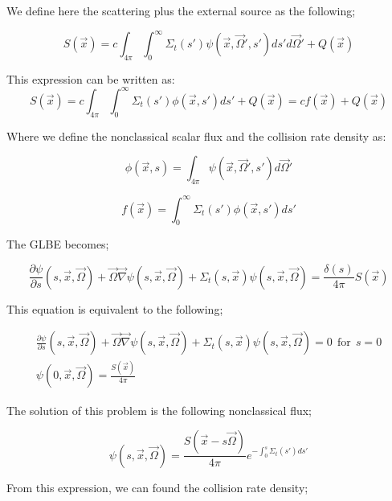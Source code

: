 \documentclass[a4paper, 12pt]{report}
\begin{document}
\begin{appendix}
We define here the scattering plus the external source as the following;

\begin{equation}
S(\vec{x}) = c \int_{4\pi}\int_0^\infty \Sigma_t(s') \psi(\vec{x},\vec{\Omega}',s') ds'd\vec{\Omega}' + Q(\vec{x})
\end{equation}

This expression can be written as:
\begin{equation}
S(\vec{x}) = c \int_{4\pi}\int_0^\infty \Sigma_t(s') \phi(\vec{x},s') ds' + Q(\vec{x}) = cf(\vec{x}) + Q(\vec{x})
\end{equation}

Where we define the nonclassical scalar flux and the collision rate density as:

\begin{equation}
\phi(\vec{x},s) = \int_{4\pi} \psi(\vec{x},\vec{\Omega}',s') d\vec{\Omega}'
\end{equation}

\begin{equation}
f(\vec{x}) = \int_0^\infty \Sigma_t(s') \phi(\vec{x},s') ds'
\end{equation}

The GLBE becomes;

\begin{equation}
\frac{\partial \psi}{\partial s} (s,\vec{x},\vec{\Omega}) + \vec{\Omega}\vec{\nabla}\psi(s,\vec{x},\vec{\Omega}) + \Sigma_t(s,\vec{x})\psi(s,\vec{x},\vec{\Omega}) = \frac{\delta(s)}{4\pi}S(\vec{x})
\end{equation}

This equation is equivalent to the following;

\begin{align}
\frac{\partial \psi}{\partial s} (s,\vec{x},\vec{\Omega}) + \vec{\Omega}\vec{\nabla}\psi(s,\vec{x},\vec{\Omega}) + \Sigma_t(s,\vec{x})\psi(s,\vec{x},\vec{\Omega}) = 0 \ \ \text{for} \ \ s =0 \\
\psi(0,\vec{x},\vec{\Omega})=\frac{S(\vec{x})}{4\pi}
\end{align}

The solution of this problem is the following nonclassical flux;

\begin{equation}
\psi(s,\vec{x},\vec{\Omega}) = \frac{S(\vec{x}-s\vec{\Omega})}{4\pi} e^{-\int_0^s \Sigma_t(s')ds'}
\end{equation}

From this expression, we can found the collision rate density;


\end{appendix}
\end{document}
